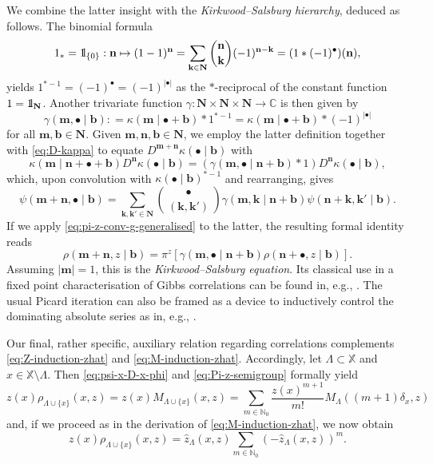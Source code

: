 \documentclass[reqno, 11pt]{amsart}
\theoremstyle{definition}
\newcommand{\N}{\mathbb{N}}
\newcommand{\C}{\mathbb{C}}
\newcommand{\X}{\mathbb X}
\newcommand{\be}{\begin{equation}}
\newcommand{\ee}{\end{equation}}
\def\1{{\mathchoice {1\mskip-4mu\mathrm l}      
{1\mskip-4mu\mathrm l}
{1\mskip-4.5mu\mathrm l} {1\mskip-5mu\mathrm l}}}
\begin{document}
We combine the latter insight with the \emph{Kirkwood--Salsburg hierarchy}, deduced as follows. 
The binomial formula
\[
	1_\ast = \1_{\{0\}} : \mathbf n  \mapsto (1 - 1)^\mathbf n = \sum_{\mathbf k \in \mathbf N} \binom{\mathbf n}{\mathbf k} (-1)^{\mathbf n - \mathbf k} = (1 \ast (-1)^\bullet)(\mathbf n),
\]
yields $1^{\ast -1} = (-1)^\bullet = (-1)^{|\bullet|}$ as the $\ast$-reciprocal of the constant function $1 = \1_\mathbf N$. 
Another trivariate function $\gamma : \mathbf N \times \mathbf N \times \mathbf N \to \C$ is then given by
\[
	\gamma(\mathbf m, \bullet \mid \mathbf b) : = \kappa(\mathbf m \mid \bullet + \mathbf b) \ast 1^{\ast -1} = \kappa(\mathbf m \mid \bullet + \mathbf b) \ast (-1)^{|\bullet|}
\]
for all $\mathbf m, \mathbf b \in \mathbf N$. 
Given $\mathbf m, \mathbf n, \mathbf b \in \mathbf N$, we employ the latter definition together with \eqref{eq:D-kappa} to equate $D^{\mathbf m + \mathbf n} \kappa(\bullet \mid \mathbf b)$ with
\[
	\kappa(\mathbf m \mid \mathbf n + \bullet + \mathbf b) D^\mathbf n \kappa(\bullet \mid \mathbf b) = (\gamma(\mathbf m, \bullet \mid \mathbf n + \mathbf b) \ast 1) D^\mathbf n \kappa(\bullet \mid \mathbf b),
\]
which, upon convolution with $\kappa(\bullet \mid \mathbf b)^{\ast -1}$ and rearranging, gives
\be \label{eq:psi-gamma-psi}
	\psi(\mathbf m + \mathbf n, \bullet \mid \mathbf b) = \sum_{\mathbf k, \mathbf k' \in \mathbf N} \binom{\bullet}{(\mathbf k, \mathbf k')} \gamma(\mathbf m, \mathbf k \mid \mathbf n + \mathbf b) \psi(\mathbf n + \mathbf k, \mathbf k' \mid \mathbf b).
\ee
If we apply \eqref{eq:pi-z-conv-g-generalised} to the latter, the resulting formal identity reads
\be \label{eq:KS}
	\rho(\mathbf m + \mathbf n, z \mid \mathbf b) = \pi^z[\gamma(\mathbf m, \bullet \mid \mathbf n + \mathbf b) \rho(\mathbf n + \bullet, z \mid \mathbf b)].
\ee
Assuming $|\mathbf m| = 1$, this is the \emph{Kirkwood--Salsburg equation}. 
Its classical use in a fixed point characterisation of Gibbs correlations can be found in, e.g., \cite{ref:ruelle, ref:gallavotti-miracle-sole, ref:jansen-cluster}. 
The usual Picard iteration can also be framed as a device to inductively control the dominating absolute series as in, e.g., \cite{ref:faris, ref:bissacot-fernandez-procacci, ref:jansen-cluster, ref:jansen-kolesnikov}.

Our final, rather specific, auxiliary relation regarding correlations complements \eqref{eq:Z-induction-zhat} and \eqref{eq:M-induction-zhat}. 
Accordingly, let $\Lambda \subset \X$ and $x \in \X \setminus \Lambda$. 
Then \eqref{eq:psi-x-D-x-phi} and \eqref{eq:Pi-z-semigroup} formally yield
\[
	z(x) \rho_{\Lambda \cup \{x\}}(x, z) = z(x) M_{\Lambda \cup \{x\}}(x, z) = \sum_{m \in \N_0} \frac{z(x)^{m+1}}{m!} M_\Lambda((m+1) \delta_x, z)
\]
and, if we proceed as in the derivation of \eqref{eq:M-induction-zhat}, we now obtain
\be \label{eq:z-rho-induction-zhat}
	z(x) \rho_{\Lambda \cup \{x\}}(x, z) = \widehat z_\Lambda(x, z) \sum_{m \in \N_0} (- \widehat z_\Lambda(x, z))^m.
\ee
\end{document}
